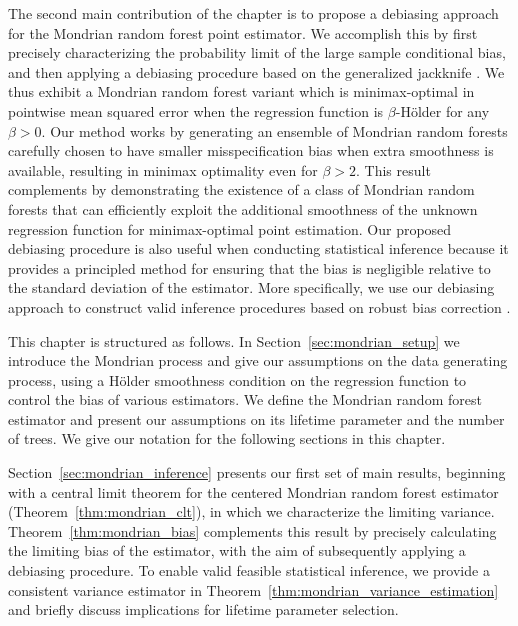 \documentclass[11pt,lof]{puthesis}
\theoremstyle{break}
\theoremstyle{proof}
\begin{document}
The second main contribution of the chapter is to propose a debiasing approach
for the Mondrian random forest point estimator. We accomplish this by first
precisely characterizing the probability limit of the large sample conditional
bias, and then applying a debiasing procedure based on the generalized
jackknife \citep{schucany1977improvement}. We thus exhibit a Mondrian random
forest variant which is minimax-optimal in pointwise mean squared error when
the regression function is $\beta$-H{\"o}lder for any $\beta > 0$. Our method
works by generating an ensemble of Mondrian random forests carefully chosen to
have smaller misspecification bias when extra smoothness is available,
resulting in minimax optimality even for $\beta > 2$. This result complements
\citet{mourtada2020minimax} by demonstrating the existence of a class of
Mondrian random forests that can efficiently exploit the additional smoothness
of the unknown regression function for minimax-optimal point estimation. Our
proposed debiasing procedure is also useful when conducting statistical
inference because it provides a principled method for ensuring that the bias is
negligible relative to the standard deviation of the estimator. More
specifically, we use our debiasing approach to construct valid inference
procedures based on robust bias correction
\citep{calonico2018effect,calonico2022coverage}.

This chapter is structured as follows. In Section~\ref{sec:mondrian_setup} we
introduce the Mondrian process and give our assumptions on the data generating
process, using a H{\"o}lder smoothness condition on the regression function to
control the bias of various estimators. We define the Mondrian random forest
estimator and present our assumptions on its lifetime parameter and the number
of trees. We give our notation for the following sections in this chapter.

Section~\ref{sec:mondrian_inference} presents our first set of main results,
beginning with a central limit theorem for the centered Mondrian random forest
estimator (Theorem~\ref{thm:mondrian_clt}), in which we characterize the
limiting
variance. Theorem~\ref{thm:mondrian_bias} complements this result by precisely
calculating the limiting bias of the estimator, with the aim of subsequently
applying a debiasing procedure. To enable valid feasible statistical inference,
we provide a consistent variance estimator in
Theorem~\ref{thm:mondrian_variance_estimation} and briefly discuss implications
for
lifetime parameter selection.
\end{document}
